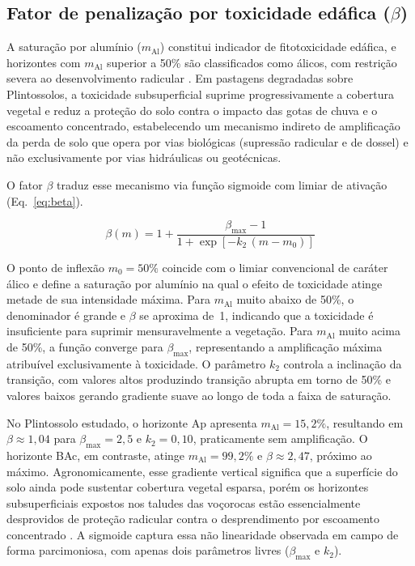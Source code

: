 \documentclass[pdflatex,sn-basic]{sn-jnl}
\begin{document}
\subsection{Fator de penalização por toxicidade edáfica (\texorpdfstring{$\beta$}{beta})}

A saturação por alumínio ($m_{\mathrm{Al}}$) constitui indicador de fitotoxicidade edáfica, e horizontes com $m_{\mathrm{Al}}$ superior a 50\% são classificados como álicos, com restrição severa ao desenvolvimento radicular \citep{embrapa_2018}. Em pastagens degradadas sobre Plintossolos, a toxicidade subsuperficial suprime progressivamente a cobertura vegetal e reduz a proteção do solo contra o impacto das gotas de chuva e o escoamento concentrado, estabelecendo um mecanismo indireto de amplificação da perda de solo que opera por vias biológicas (supressão radicular e de dossel) e não exclusivamente por vias hidráulicas ou geotécnicas.

O fator $\beta$ traduz esse mecanismo via função sigmoide com limiar de ativação (Eq.~\ref{eq:beta}).

\begin{equation}
\beta(m) = 1 + \frac{\beta_{\max} - 1}{1 + \exp\!\left[-k_2\,(m - m_0)\right]}
\label{eq:beta}
\end{equation}

O ponto de inflexão $m_0 = 50\%$ coincide com o limiar convencional de caráter álico e define a saturação por alumínio na qual o efeito de toxicidade atinge metade de sua intensidade máxima. Para $m_{\mathrm{Al}}$ muito abaixo de 50\%, o denominador é grande e $\beta$ se aproxima de~1, indicando que a toxicidade é insuficiente para suprimir mensuravelmente a vegetação. Para $m_{\mathrm{Al}}$ muito acima de 50\%, a função converge para $\beta_{\max}$, representando a amplificação máxima atribuível exclusivamente à toxicidade. O parâmetro $k_2$ controla a inclinação da transição, com valores altos produzindo transição abrupta em torno de 50\% e valores baixos gerando gradiente suave ao longo de toda a faixa de saturação.

No Plintossolo estudado, o horizonte Ap apresenta $m_{\mathrm{Al}} = 15{,}2\%$, resultando em $\beta \approx 1{,}04$ para $\beta_{\max} = 2{,}5$ e $k_2 = 0{,}10$, praticamente sem amplificação. O horizonte BAc, em contraste, atinge $m_{\mathrm{Al}} = 99{,}2\%$ e $\beta \approx 2{,}47$, próximo ao máximo. Agronomicamente, esse gradiente vertical significa que a superfície do solo ainda pode sustentar cobertura vegetal esparsa, porém os horizontes subsuperficiais expostos nos taludes das voçorocas estão essencialmente desprovidos de proteção radicular contra o desprendimento por escoamento concentrado \citep{vannoppen_2015}. A sigmoide captura essa não linearidade observada em campo de forma parcimoniosa, com apenas dois parâmetros livres ($\beta_{\max}$ e $k_2$).
\end{document}
